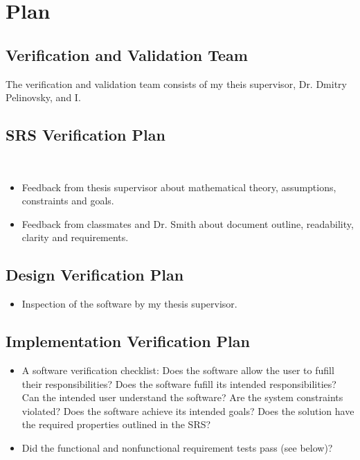 \documentclass[12pt, titlepage]{article}
\begin{document}
\section{Plan}
	
\subsection{Verification and Validation Team}

The verification and validation team consists of my theis supervisor, Dr. 
Dmitry Pelinovsky, and I. 

\subsection{SRS Verification Plan}

 \\ 
\begin{itemize}
	\item Feedback from thesis supervisor about mathematical theory, 
	assumptions, constraints and goals.
	\item Feedback from classmates and Dr. Smith about document outline, 
	readability, clarity and requirements. 
	
\end{itemize}


\subsection{Design Verification Plan}

\begin{itemize}
	\item Inspection of the software by my thesis supervisor. 
\end{itemize}

\subsection{Implementation Verification Plan}

\begin{itemize}
\item A software verification checklist: Does the software allow the user to 
fufill their responsibilities? Does the software fufill its intended 
responsibilities? Can the intended user understand the software? Are the system 
constraints violated? Does the software achieve its intended goals? Does the 
solution have the required properties outlined in the SRS? 
\item Did the functional and nonfunctional requirement tests pass (see below)? 
\end{itemize}
\end{document}
